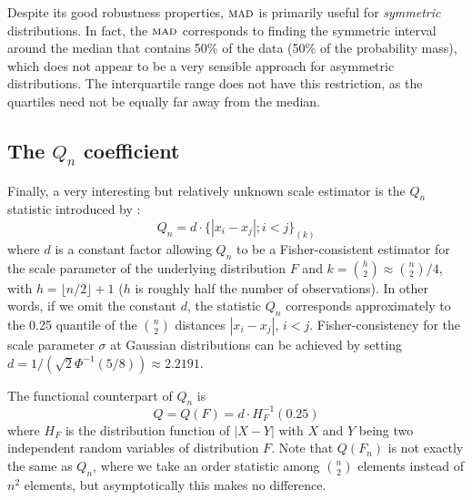 Despite its good robustness properties, $\stsc{MAD}$ is primarily useful for
\emph{symmetric} distributions. In fact, the $\stsc{MAD}$ corresponds to
finding the symmetric interval around the median that contains 50\% of the data
(50\% of the probability mass), which does not appear to be a very sensible
approach for asymmetric distributions. The interquartile range does not have
this restriction, as the quartiles need not be equally far away from the median.



\subsection{The $Q_n$ coefficient}

Finally, a very interesting but relatively unknown scale estimator is the
$Q_n$ statistic introduced by \citet{rousseeuw:croux:1993}:
\[
    Q_n =   d\cdot \{|x_i-x_j|; i<j\}_{(k)}
\]
where $d$ is a constant factor allowing $Q_n$ to be a Fisher-consistent
estimator for the scale parameter of the underlying distribution $F$ and $k =
\binom{h}{2} \approx \binom{n}{2}/4$, with $h = \lfloor n/2\rfloor + 1$ ($h$ is
roughly half the number of observations). In other words, if we omit the
constant $d$, the statistic $Q_n$ corresponds approximately to the 0.25
quantile of the $\binom{n}{2}$ distances $|x_i-x_j|$, $i<j$. Fisher-consistency for the 
scale parameter $\sigma$ at Gaussian distributions can be achieved by setting
$d = 1/\left(\sqrt{2}\Phi^{-1}(5/8)\right) \approx 2.2191$.                     

The functional counterpart of $Q_n$ is 
\[
    Q = Q(F) = d\cdot H_{F}^{-1}(0.25)
\]
where $H_{F}$ is the distribution function of $|X-Y|$ with $X$ and $Y$ being two
independent random variables of distribution $F$. Note that $Q(F_n)$ is not
exactly the same as $Q_n$, where we take an order statistic among $\binom{n}{2}$
elements instead of $n^2$ elements, but asymptotically this makes no difference.

